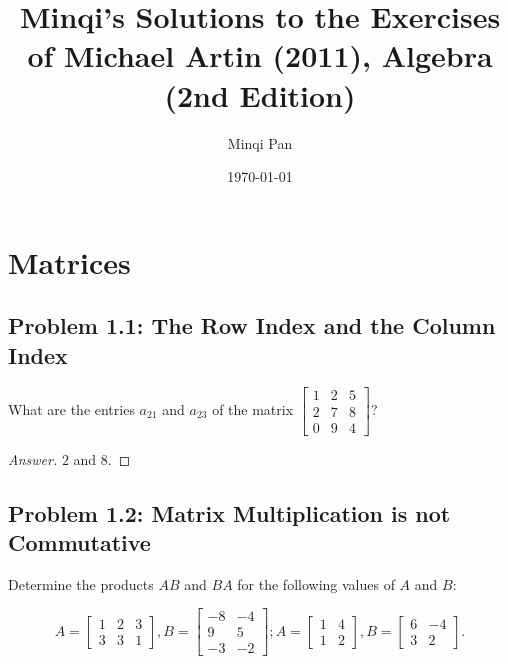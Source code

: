 \documentclass{amsbook}
\theoremstyle{definition}
\theoremstyle{remark}
\numberwithin{section}{chapter}
\numberwithin{equation}{chapter}
\begin{document}
\frontmatter

\title{Minqi's Solutions to the Exercises of Michael Artin (2011), Algebra (2nd Edition)}

\author{Minqi Pan}

\date{\today}

\maketitle

\setcounter{page}{4}

\tableofcontents

\mainmatter

\chapter{Matrices}

\section{Problem 1.1: The Row Index and the Column Index}

What are the entries $a_{21}$ and $a_{23}$ of the matrix $\begin{bmatrix}
1 & 2 & 5\\
2 & 7 & 8\\
0 & 9 & 4
\end{bmatrix}$?

\begin{proof}[Answer]
$2$ and $8$.
\end{proof}

\section{Problem 1.2: Matrix Multiplication is not Commutative}

Determine the products $AB$ and $BA$ for the following values of $A$ and $B$:

\[ A=\begin{bmatrix}
1&2&3\\
3&3&1
\end{bmatrix}, B=\begin{bmatrix}
-8 & -4\\
9  & 5\\
-3 & -2\end{bmatrix}; A=\begin{bmatrix}
1&4\\
1&2\end{bmatrix}, B=\begin{bmatrix}
6 & -4\\
3 & 2\end{bmatrix}. \]
\end{document}
